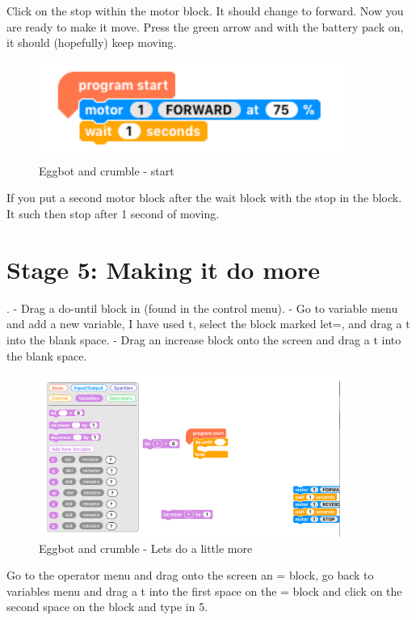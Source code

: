Click on the stop within the motor block. It should change to forward. Now you are ready to make it move. Press the green arrow and with the battery pack on, it should (hopefully) keep moving.

\begin{figure}
    \centering
    \includegraphics[width=10cm]{chapters/ChapterP1/figures/eggbot_stage8.png}
    \caption{Eggbot and crumble - start}
    \label{fig:EgggbotdrawingCrumble5}
\end{figure}

If you put a second motor block after the wait block with the stop in the block. It such then stop after 1 second of moving.

\section{Stage 5: Making it do more}
.
-   	Drag a do-until block in (found in the control menu).
-   	Go to variable menu and add a new variable, I have used t, select the block marked let=, and drag a t into the blank space.
-   	Drag an increase block onto the screen and drag a t into the blank space.


\begin{figure}
    \centering
    \includegraphics[width=10cm]{chapters/ChapterP1/figures/eggbot_stage9.png}
    \caption{Eggbot and crumble - Lets do a little more}
    \label{fig:EgggbotdrawingCrumbleMore1}
\end{figure}

Go to the operator menu and drag onto the screen an = block, go back to variables menu and drag a t into the first space on the = block and click on the second space on the block and type in 5.

